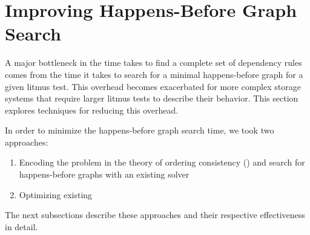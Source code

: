 \section{Improving Happens-Before Graph Search}
\label{s:improved-search}
A major bottleneck in the time \depsynth takes to find a complete set of
dependency rules comes from the time it takes to search for a minimal
happens-before graph for a given litmus test.
This overhead becomes exacerbated for more complex storage systems
that require larger litmus tests to describe their behavior.
This section explores techniques for reducing this overhead.

In order to minimize the happens-before graph search time,
we took two approaches:
\begin{enumerate}
  \item Encoding the problem in the theory of ordering consistency (\tord)
        and search for happens-before graphs with an existing \tord solver
  \item Optimizing existing
\end{enumerate}
The next subsections describe these approaches and their respective effectiveness
in detail.
